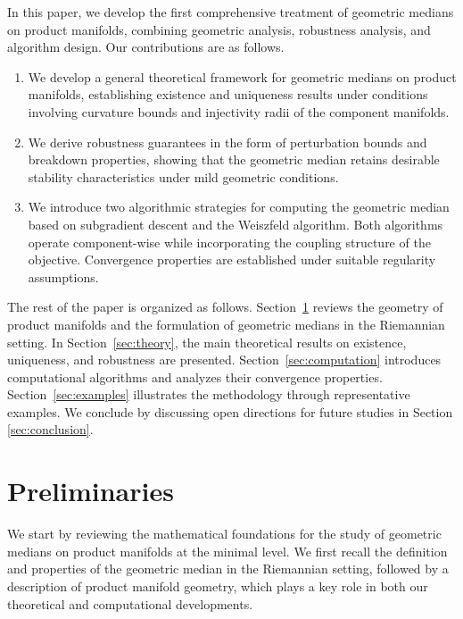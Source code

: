 \documentclass[10pt]{article}
\begin{document}
In this paper, we develop the first comprehensive treatment of geometric medians on product manifolds, combining geometric analysis, robustness analysis, and algorithm design. Our contributions are as follows. 
\begin{enumerate}
	\item We develop a general theoretical framework for geometric medians on product manifolds, establishing existence and uniqueness results under conditions involving curvature bounds and injectivity radii of the component manifolds.
	\item We derive robustness guarantees in the form of perturbation bounds and breakdown properties, showing that the geometric median retains desirable stability characteristics under mild geometric conditions.
	\item We introduce two algorithmic strategies for computing the geometric median based on subgradient descent and the Weiszfeld algorithm. Both algorithms operate component-wise while incorporating the coupling structure of the objective. Convergence properties are established under suitable regularity assumptions.
\end{enumerate}






The rest of the paper is organized as follows. Section~\ref{sec:preliminaries} reviews the geometry of product manifolds and the formulation of geometric medians in the Riemannian setting. In Section~\ref{sec:theory}, the main theoretical results on existence, uniqueness, and robustness are presented. Section~\ref{sec:computation} introduces computational algorithms and analyzes their convergence properties. Section~\ref{sec:examples} illustrates the methodology through representative examples. We conclude by discussing open directions for future studies in Section \ref{sec:conclusion}.


\section{Preliminaries}\label{sec:preliminaries}


We start by reviewing the mathematical foundations for the study of geometric medians on product manifolds at the minimal level. We first recall the definition and properties of the geometric median in the Riemannian setting, followed by a description of product manifold geometry, which plays a key role in both our theoretical and computational developments.
\end{document}

